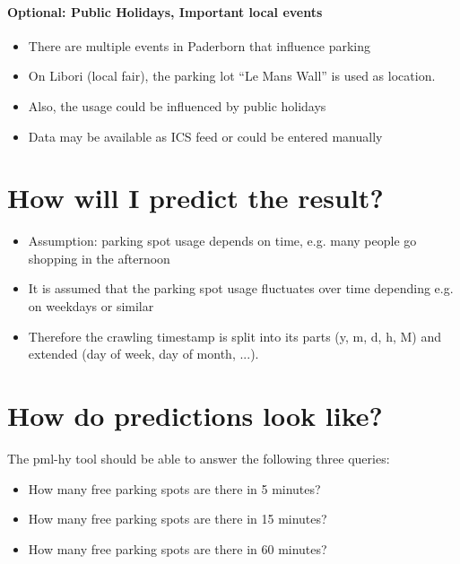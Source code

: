 \documentclass[journal,10pt]{IEEEtran}
\begin{document}
\paragraph{Optional: Public Holidays, Important local events}
\begin{itemize}
  \item There are multiple events in Paderborn that influence parking
  \item On Libori (local fair), the parking lot ``Le Mans Wall'' is used as location.
  \item Also, the usage could be influenced by public holidays
  \item Data may be available as ICS feed or could be entered manually
\end{itemize}


\section{How will I predict the result?}

\begin{itemize}
 \item Assumption: parking spot usage depends on time, e.g. many people go shopping in the afternoon
 \item It is assumed that the parking spot usage fluctuates over time depending e.g. on weekdays or similar
 \item Therefore the crawling timestamp is split into its parts (y, m, d, h, M) and extended (day of week, day of month, ...).
\end{itemize}

\section{How do predictions look like?}

The pml-hy tool should be able to answer the following three queries:
\begin{itemize}
 \item How many free parking spots are there in 5 minutes?
 \item How many free parking spots are there in 15 minutes?
 \item How many free parking spots are there in 60 minutes?
\end{itemize}




\end{document}
